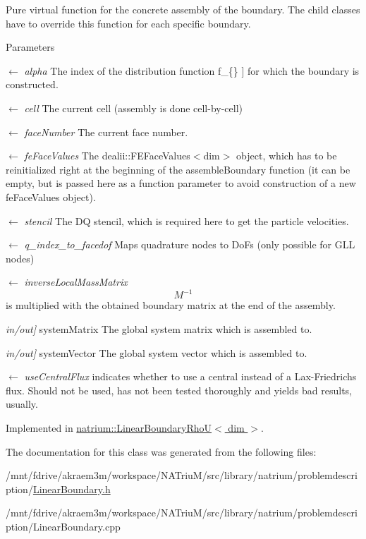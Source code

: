 Pure virtual function for the concrete assembly of the boundary. The child classes have to override this function for each specific boundary. 
\begin{DoxyParams}{Parameters}
\item[\mbox{$\leftarrow$} {\em alpha}]The index of the distribution function  f\_\-\{\} \mbox{]} for which the boundary is constructed. \item[\mbox{$\leftarrow$} {\em cell}]The current cell (assembly is done cell-\/by-\/cell) \item[\mbox{$\leftarrow$} {\em faceNumber}]The current face number. \item[\mbox{$\leftarrow$} {\em feFaceValues}]The dealii::FEFaceValues$<$dim$>$ object, which has to be reinitialized right at the beginning of the assembleBoundary function (it can be empty, but is passed here as a function parameter to avoid construction of a new feFaceValues object). \item[\mbox{$\leftarrow$} {\em stencil}]The DQ stencil, which is required here to get the particle velocities. \item[\mbox{$\leftarrow$} {\em q\_\-index\_\-to\_\-facedof}]Maps quadrature nodes to DoFs (only possible for GLL nodes) \item[\mbox{$\leftarrow$} {\em inverseLocalMassMatrix}]\[ M^{-1} \] is multiplied with the obtained boundary matrix at the end of the assembly. \item[{\em in/out\mbox{]}}]systemMatrix The global system matrix which is assembled to. \item[{\em in/out\mbox{]}}]systemVector The global system vector which is assembled to. \item[\mbox{$\leftarrow$} {\em useCentralFlux}]indicates whether to use a central instead of a Lax-\/Friedrichs flux. Should not be used, has not been tested thoroughly and yields bad results, usually. \end{DoxyParams}


Implemented in \hyperlink{classnatrium_1_1LinearBoundaryRhoU_a5e8291245a4d0a81ed8a7545e0ffbe96}{natrium::LinearBoundaryRhoU$<$ dim $>$}.

The documentation for this class was generated from the following files:\begin{DoxyCompactItemize}
\item 
/mnt/fdrive/akraem3m/workspace/NATriuM/src/library/natrium/problemdescription/\hyperlink{LinearBoundary_8h}{LinearBoundary.h}\item 
/mnt/fdrive/akraem3m/workspace/NATriuM/src/library/natrium/problemdescription/LinearBoundary.cpp\end{DoxyCompactItemize}
